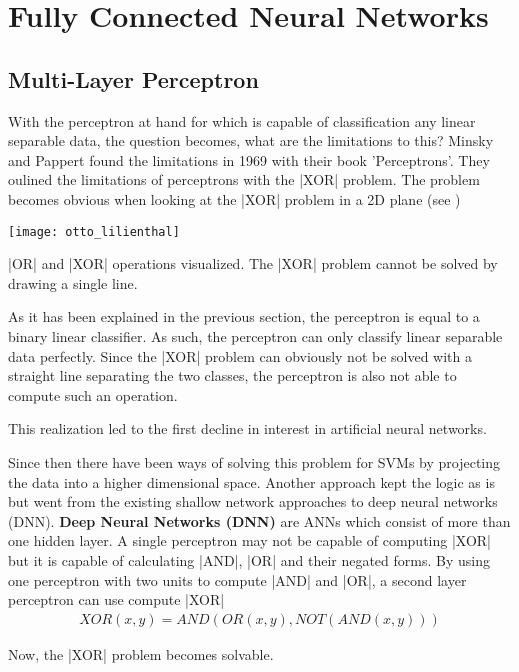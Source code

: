 \section[Fully Connected NNs]{Fully Connected Neural Networks}
\subsection{Multi-Layer Perceptron}
With the perceptron at hand for which is capable of classification any linear separable data, the question becomes, what are the limitations to this?
Minsky and Pappert found the limitations in 1969 with their book 'Perceptrons'.
They oulined the limitations of perceptrons with the |XOR| problem.
The problem becomes obvious when looking at the |XOR| problem in a 2D plane (see )
\begin{marginfigure}
    \texttt{[image: otto\_lilienthal]}
    \caption[]{|OR| and |XOR| operations visualized. The |XOR| problem cannot be solved by drawing a single line.}
\end{marginfigure}

As it has been explained in the previous section, the perceptron is equal to a binary linear classifier.
As such, the perceptron can only classify linear separable data perfectly.
Since the |XOR| problem can obviously not be solved with a straight line separating the two classes, the perceptron is also not able to compute such an operation. 

This realization led to the first decline in interest in artificial neural networks.

Since then there have been ways of solving this problem for SVMs by projecting the data into a higher dimensional space.
Another approach kept the logic as is but went from the existing shallow network approaches to deep neural networks (DNN).
\textbf{Deep Neural Networks (DNN)} are ANNs which consist of more than one hidden layer.
A single perceptron may not be capable of computing |XOR| but it is capable of calculating |AND|, |OR| and their negated forms.
By using one perceptron with two units to compute |AND| and |OR|, a second layer perceptron can use compute |XOR|
\begin{align}
    XOR(x, y) = AND(OR(x, y), NOT(AND(x, y)))
\end{align}

Now, the |XOR| problem becomes solvable.


